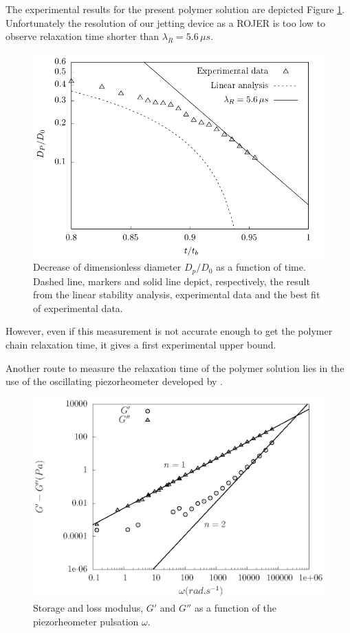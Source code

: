 \documentclass[twocolumn,10pt]{asme2ej}
\begin{document}
The experimental results for the present polymer solution are depicted Figure \ref{Rojer}. Unfortunately the resolution of our jetting device as a ROJER is too low to observe relaxation time shorter than $\lambda_R=5.6 \, \mu s$.
\begin{figure}[H] 
    \vspace{2cm}
    \centering
     \includegraphics[width=12cm]{ROJER/rojer_bilan_zoomed.pdf}
     \caption{Decrease of dimensionless diameter $D_p/D_0$ as a function of time. Dashed line, markers and solid line depict, respectively, the result from the linear stability analysis,  experimental data and the best fit of experimental data.}
      \label{Rojer}
  \end{figure}
However, even if this measurement is not accurate enough to get the polymer chain relaxation time, it gives a first experimental upper bound.

Another route to measure the relaxation time of the polymer solution lies in the use of the oscillating piezorheometer developed by \cite{buchanan2005high}. 

\begin{figure}[H]
    \begin{center}
    \includegraphics[width=12cm]{Moduli_bilan}
    \caption{Storage and loss modulus, $G'$ and $G''$ as a function of the piezorheometer pulsation $\omega$.}
    \label{piezo}
    \end{center}
\end{figure}
\end{document}
